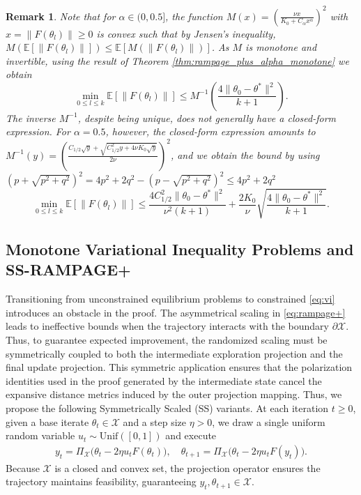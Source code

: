 \documentclass[letter,11pt]{article}
\newcommand{\E}{\mathbb{E}}
\newtheorem{remark}{\textbf{Remark}}
\begin{document}
\begin{remark}\label{rem:alpha_rampage}
 Note that for $\alpha \in (0,0.5]$, the function $M(x) = \left( \frac{\nu x}{K_0 + C_\alpha x^\alpha} \right)^2$ with $x = \|F(\theta_l)\| \geq 0$ is convex such that by Jensen's inequality, $M(\E[\|F(\theta_l)\|]) \leq \mathbb{E}[M(\|F(\theta_l)\|)]$. As $M$ is monotone and invertible, using the result of Theorem \ref{thm:rampage_plus_alpha_monotone} we obtain
\begin{equation}
 \min_{0 \le l \le k} \mathbb{E}[\|F(\theta_l)\|] \le M^{-1}\left(\frac{4\|\theta_0 - \theta^*\|^2}{k+1}\right).
\end{equation}
The inverse $ M^{-1}$, despite being unique, does not generally have a closed-form expression. For $\alpha = 0.5$, however, the closed-form expression amounts to $M^{-1}(y) = \left( \frac{C_{1/2} \sqrt{y} + \sqrt{C_{1/2}^2 y + 4\nu K_0 \sqrt{y}}}{2\nu} \right)^2$, and we obtain the bound by using $(p+\sqrt{p^2+q^2})^2=4p^2+2q^2-(p-\sqrt{p^2+q^2})^2\leq 4p^2+2q^2$
\begin{equation}
  \min_{0 \le l \le k} \mathbb{E}[\|F(\theta_l)\|] \le \frac{4 C_{1/2}^2\|\theta_0 - \theta^*\|^2}{\nu^{2}(k+1)} + \frac{2 K_0}{\nu} \sqrt{\frac{4\|\theta_0 - \theta^*\|^2}{k+1}}.
\end{equation}
\end{remark}
\subsection{Monotone Variational Inequality Problems and SS-RAMPAGE+}
Transitioning from unconstrained equilibrium problems to constrained \eqref{eq:vi} introduces an obstacle in the proof. The asymmetrical scaling in \eqref{eq:rampage+} leads to ineffective bounds when the trajectory interacts with the boundary $\partial \mathcal{X}$. Thus, to guarantee expected improvement, the randomized scaling must be symmetrically coupled to both the intermediate exploration projection and the final update projection. This symmetric application ensures that the polarization identities used in the proof generated by the intermediate state cancel the expansive distance metrics induced by the outer projection mapping.
Thus, we propose the following Symmetrically Scaled (SS) variants. At each iteration $t \ge 0$, given a base iterate $\theta_t \in \mathcal{X}$ and a step size $\eta > 0$, we draw a single uniform random variable $u_t \sim \mathrm{Unif}([0, 1])$ and execute
\begin{equation}\label{eq:ss-rampage}
\tag{SS-RAMPAGE}
\begin{aligned}
y_t = \Pi_{\mathcal{X}} \big( \theta_t - 2\eta u_t F(\theta_t) \big), \quad
\theta_{t+1} = \Pi_{\mathcal{X}} \big( \theta_t - 2\eta u_t F(y_t) \big).
\end{aligned}
\end{equation}
Because $\mathcal{X}$ is a closed and convex set, the projection operator ensures the trajectory maintains feasibility, guaranteeing $y_t, \theta_{t+1} \in \mathcal{X}$. 
\end{document}
